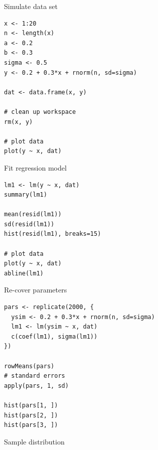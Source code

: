 \documentclass[aspectratio=169]{beamer}
\begin{document}
\begin{frame}[fragile]{Simulate data set}
\begin{lstlisting}
x <- 1:20
n <- length(x)
a <- 0.2
b <- 0.3
sigma <- 0.5
y <- 0.2 + 0.3*x + rnorm(n, sd=sigma)

dat <- data.frame(x, y)

# clean up workspace
rm(x, y)

# plot data
plot(y ~ x, dat)
\end{lstlisting}
  \nocite{GelmanHill2020}
\end{frame}

\begin{frame}[fragile]{Fit regression model}
\begin{lstlisting}
lm1 <- lm(y ~ x, dat)
summary(lm1)

mean(resid(lm1))
sd(resid(lm1))
hist(resid(lm1), breaks=15)

# plot data
plot(y ~ x, dat)
abline(lm1)
\end{lstlisting}
\end{frame}

\begin{frame}[fragile]{Re-cover parameters}
\begin{lstlisting}
pars <- replicate(2000, {
  ysim <- 0.2 + 0.3*x + rnorm(n, sd=sigma)
  lm1 <- lm(ysim ~ x, dat)
  c(coef(lm1), sigma(lm1))
})

rowMeans(pars)
# standard errors
apply(pars, 1, sd)

hist(pars[1, ])
hist(pars[2, ])
hist(pars[3, ])
\end{lstlisting}
\end{frame}

\begin{frame}{Sample distribution}
  \begin{center}
  \end{center}
\end{frame}
\end{document}
